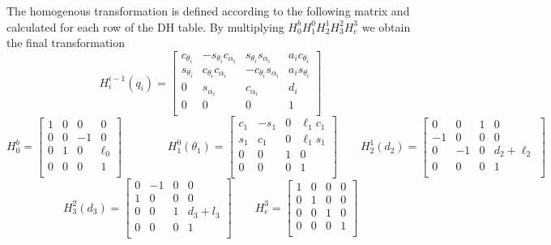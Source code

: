 \documentclass[a4paper,12pt]{article}
\renewcommand*{\a}{\alpha}
\renewcommand*{\t}{\theta}
\renewcommand*{\l}{\ell}
\begin{document}
\noindent The homogenous transformation is defined according to the following matrix and calculated for each row of the DH table. By multiplying $H^b_0H^0_1H^1_2H^2_3H^3_e$ we obtain the final transformation
\[
H^{i - 1}_{i}(q_i) = \begin{bmatrix}
    c_{\t_i} &  - s_{\t_i}c_{\a_i} & s_{\t_i}s_{\a_i} & a_i c_{\t_i} \\
    s_{\t_i} & c_{\t_i}c_{\a_i} &  - c_{\t_i}s_{\a_i} & a_i s_{\t_i} \\
        0    &     s_{\a_i}     &     c_{\a_i}     &     d_i     \\
        0    &         0        &         0        &     1        \\
\end{bmatrix}
\]
\[
H^b_0 = \begin{bmatrix}
    1 & 0 & 0 &    0    \\
    0 & 0 &  - 1 &    0    \\
    0 & 1 & 0 & \l_0 \\
    0 & 0 & 0 &    1    \\
\end{bmatrix}
\qquad
\qquad
H^0_1(\t_1) = \begin{bmatrix}
    c_1 &  - s_1 & 0 & \l_1 c_1 \\
    s_1 & c_1 & 0 & \l_1 s_1 \\
        0    &     0    & 1 &        0        \\
        0    &     0    & 0 &        1        \\
\end{bmatrix}
\qquad
H^1_2(d_2) = \begin{bmatrix}
    0 &  0 & 1 & 0 \\
    -1 & 0 & 0 & 0 \\
        0    &    -1    & 0 &        d_2+\l_2       \\
        0    &     0    & 0 &        1        \\
\end{bmatrix}
\]
\[
H^2_3(d_3) = \begin{bmatrix}
    0 & -1 & 0 & 0 \\
    1 & 0 & 0 & 0 \\
    0 & 0 & 1 & d_3 + l_3 \\
    0 & 0 & 0 & 1 \\
\end{bmatrix}
\qquad
H^3_e = \begin{bmatrix}
    1 & 0 & 0 & 0 \\
    0 & 1 & 0 & 0 \\
    0 & 0 & 1 & 0 \\
    0 & 0 & 0 & 1 \\
\end{bmatrix}
\]
\end{document}

